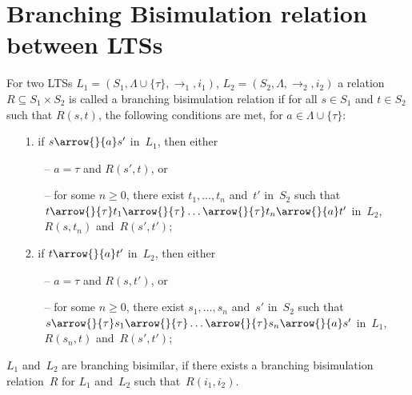 
\section{Branching Bisimulation relation between LTSs}
\label{app:A}
\begin{definition}
 \label{branching_bisimulation}
For two LTSs $L_1 = (S_1, \Lambda\cup\{\tau\}, \rightarrow_1, i_1)$, $L_2 = (S_2, \Lambda, \rightarrow_2, i_2)$ a  relation $R \subseteq S_1 \times S_2$ is called a branching   bisimulation relation if for all $s \in S_1$ and $t \in S_2$ such that $R(s,t)$, the following conditions are met, for $a\in \Lambda\cup\{\tau\}$:
  \begin{itemize}
  \item[1.] if $s \arrow{}{a} s'$ in~$L_1$, then either
    \begin{itemize}
    \item [--] $a = \tau$ and $R(s',t)$, or
    \item [--] for some $n \geq 0$, there exist $t_1, \ldots, t_n$ and~$t'$ in~$S_2$ such that \\
     $t \arrow{}{\tau} t_1 \arrow{}{\tau}\ldots \arrow{}{\tau} t_{n}
      \arrow{}{a} t'$ in~$L_2$, $R(s,t_n)$ and~$R(s',t')$;
    \end{itemize}
  \item[2.] if $t \arrow{}{a} t'$ in~$L_2$, then either
    \begin{itemize}
    \item [--] $a = \tau$ and $R(s,t')$, or
    \item [--] for some $n \geq 0$, there exist $s_1, \ldots, s_n$
      and~$s'$ in~$S_2$ such that \\
      $s \arrow{}{\tau} s_1
      \arrow{}{\tau} \ldots \arrow{}{\tau} s_{n}
      \arrow{}{a} s'$ in~$L_1$, $R(s_n,t)$ and~$R(s',t')$;
    \end{itemize}
  \end{itemize}
$L_1$ and~$L_2$
are branching bisimilar,
if there exists a   branching bisimulation relation~$R$ for $L_1$ and~$L_2$ such that~$R(i_1,i_2)$.
\end{definition}

